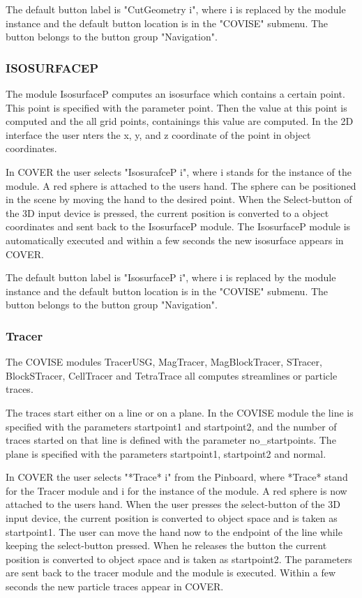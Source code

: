 The default button label is "CutGeometry i", where i is replaced
by the module instance and
the default button location is in the "COVISE" submenu.
The button belongs to the button group "Navigation". 
		
\subsubsection{ISOSURFACEP}
The module IsosurfaceP computes an isosurface which contains a
certain point. This point is specified with the parameter point. Then the
value at this point is computed and the all grid points, containings this
value are computed. In the 2D interface the user nters the x, y, and z coordinate
of the point in object coordinates.

In COVER the user selects "IsosurafceP i", where i stands for the instance
of the module. A red sphere is attached to the users hand. The sphere can be 
positioned in the scene by moving the hand to the desired point. 
When the Select-button
of the 3D input device is pressed, the current position is converted
to a object coordinates and sent back to the IsosurfaceP module. The
IsosurfaceP module is automatically executed and within a few seconds
the new isosurface appears in COVER.

The default button label is "IsosurfaceP i", where i is replaced
by the module instance and
the default button location is in the "COVISE" submenu.
The button belongs to the button group "Navigation". 
		
\subsubsection{Tracer}

The COVISE modules TracerUSG, MagTracer, MagBlockTracer, STracer, BlockSTracer,
CellTracer and TetraTrace all computes streamlines or particle traces.

The traces start either on a line or on a plane. In the COVISE module the
line is specified with the parameters startpoint1 and startpoint2, and the
number of traces started on that line is defined with the parameter
no\_startpoints. The plane is specified with the parameters startpoint1,
startpoint2 and normal. 

In COVER the user selects "*Trace* i" from the Pinboard, where *Trace* stand 
for the Tracer module and i for the instance of the module. A red sphere
is now attached to the users hand. When the user presses the select-button
of the 3D input device, the current position is converted to object space
and is taken as startpoint1. The user
can move the hand now to the endpoint of the line while keeping the select-button
pressed. When he releases the button the current position is converted to object
space and is taken as startpoint2. The parameters are sent back to the tracer
module and the module is executed. Within a few seconds the new particle traces
appear in COVER.



